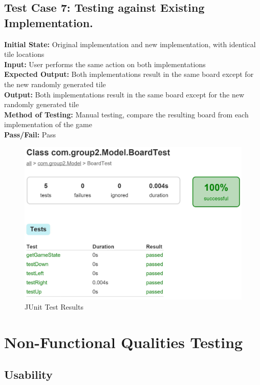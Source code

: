 \documentclass[12pt]{article}
\begin{document}
\subsection{Test Case 7: Testing against Existing Implementation.}
\textbf{Initial State:} Original implementation and new implementation, with identical tile locations\\
\textbf{Input:} User performs the same action on both implementations\\
\textbf{Expected Output:} Both implementations result in the same board except for the new randomly generated tile\\
\textbf{Output:} Both implementations result in the same board except for the new randomly generated tile\\
\textbf{Method of Testing:} Manual testing, compare the resulting board from each implementation of the game\\
\textbf{Pass/Fail:} Pass

\begin{figure}[H]
	\centering
	\includegraphics[width = 14cm]{JUnit_Test_Results}
	\caption{JUnit Test Results}
	\label{JUnit Test Results}
\end{figure}

\section{Non-Functional Qualities Testing}
\subsection{Usability}
\end{document}
